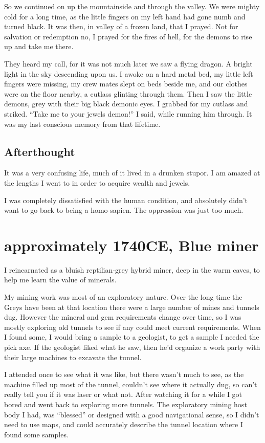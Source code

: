 So we continued on up the mountainside and through the valley.  We were mighty cold for a long time, as the little fingers on my left hand had gone numb and turned black.  It was then,  in valley of a frozen land, that I prayed. Not for salvation or redemption no, I prayed for the fires of hell,  for the demons to rise up and take me there.

They heard my call, for it was not much later we saw a flying dragon. A bright
light in the sky descending upon us. I awoke on a hard metal bed, my little left
fingers were missing, my crew mates slept on beds beside me, and our clothes
were on the floor nearby, a cutlass glinting through them. Then I saw the little
demons, grey with their big black demonic eyes.  I grabbed for my cutlass and
striked. “Take me to your jewels demon!” I said, while running him through.  It was my last conscious memory from that lifetime.

\section{Afterthought}
It was a very confusing life, much of it lived in a drunken stupor. 
I am amazed at the lengths I went to in order to acquire wealth and jewels.

I was completely dissatisfied with the human condition, and absolutely didn't
want to go back to being a homo-sapien. The oppression was just too much.


\chapter{approximately 1740CE, Blue miner}
\label{greyMiner}
I reincarnated as a bluish reptilian-grey hybrid miner, deep in the warm caves,
to help me learn the value of minerals.

My mining work was most of an exploratory nature. Over the long time the Greys
have been at that location there were a large number of mines and tunnels dug.
However the mineral and gem requirements change over time, so I was mostly
exploring old tunnels to see if any could meet current requirements. When I
found some, I would bring a sample to a geologist, to get a sample I needed the
pick axe. If the geologist liked what he saw, then he'd organize a work party
with their large machines to excavate the tunnel.

I attended once to see what it was like, but there wasn't much to see, as the
machine filled up most of the tunnel, couldn't see where it actually dug, so
can't really tell you if it was laser or what not. After watching it for a while
I got bored and went back to exploring more tunnels. The exploratory mining host
body I had, was ``blessed'' or designed with a good navigational sense, so I
didn't need to use maps, and could accurately describe the tunnel location where
I found some samples.


